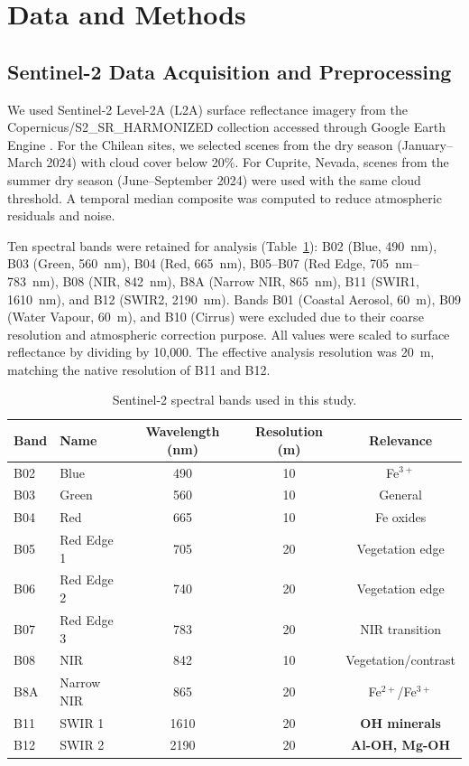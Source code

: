 \documentclass[preprint,authoryear,number]{elsarticle}
\begin{document}
\section{Data and Methods}
\label{sec:methods}

\subsection{Sentinel-2 Data Acquisition and Preprocessing}

We used Sentinel-2 Level-2A (L2A) surface reflectance imagery from the Copernicus/S2\_SR\_HARMONIZED collection accessed through Google Earth Engine \citep{Gorelick2017}. For the Chilean sites, we selected scenes from the dry season (January--March 2024) with cloud cover below 20\%. For Cuprite, Nevada, scenes from the summer dry season (June--September 2024) were used with the same cloud threshold. A temporal median composite was computed to reduce atmospheric residuals and noise.

Ten spectral bands were retained for analysis (Table~\ref{tab:s2bands}): B02 (Blue, \SI{490}{\nano\meter}), B03 (Green, \SI{560}{\nano\meter}), B04 (Red, \SI{665}{\nano\meter}), B05--B07 (Red Edge, \SIrange{705}{783}{\nano\meter}), B08 (NIR, \SI{842}{\nano\meter}), B8A (Narrow NIR, \SI{865}{\nano\meter}), B11 (SWIR1, \SI{1610}{\nano\meter}), and B12 (SWIR2, \SI{2190}{\nano\meter}). Bands B01 (Coastal Aerosol, \SI{60}{\meter}), B09 (Water Vapour, \SI{60}{\meter}), and B10 (Cirrus) were excluded due to their coarse resolution and atmospheric correction purpose. All values were scaled to surface reflectance by dividing by 10{,}000. The effective analysis resolution was \SI{20}{\meter}, matching the native resolution of B11 and B12.

\begin{table}[h]
\centering
\caption{Sentinel-2 spectral bands used in this study.}
\label{tab:s2bands}
\begin{tabular}{llccc}
\toprule
Band & Name & Wavelength (nm) & Resolution (m) & Relevance \\
\midrule
B02 & Blue & 490 & 10 & Fe$^{3+}$ \\
B03 & Green & 560 & 10 & General \\
B04 & Red & 665 & 10 & Fe oxides \\
B05 & Red Edge 1 & 705 & 20 & Vegetation edge \\
B06 & Red Edge 2 & 740 & 20 & Vegetation edge \\
B07 & Red Edge 3 & 783 & 20 & NIR transition \\
B08 & NIR & 842 & 10 & Vegetation/contrast \\
B8A & Narrow NIR & 865 & 20 & Fe$^{2+}$/Fe$^{3+}$ \\
B11 & SWIR 1 & 1610 & 20 & \textbf{OH minerals} \\
B12 & SWIR 2 & 2190 & 20 & \textbf{Al-OH, Mg-OH} \\
\bottomrule
\end{tabular}
\end{table}
\end{document}
